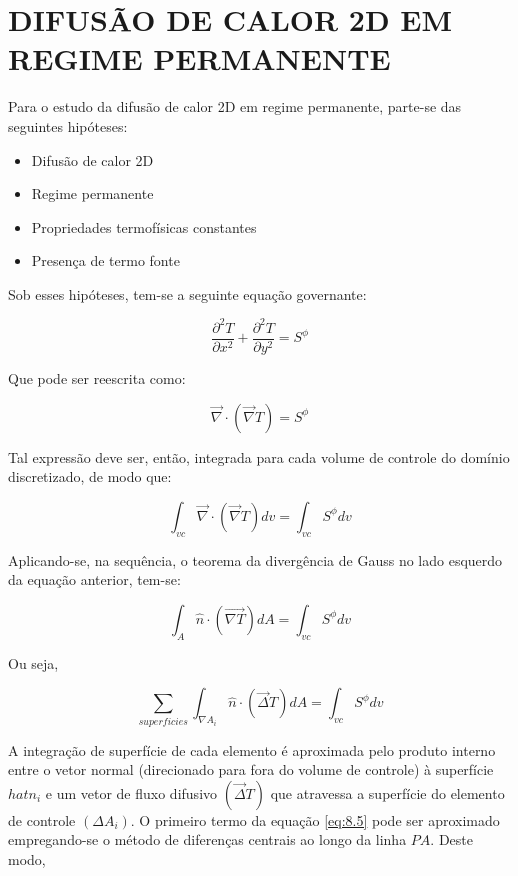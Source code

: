 \chapter[DIFUSÃO DE CALOR 2D EM REGIME PERMANENTE]{DIFUSÃO DE CALOR 2D EM REGIME PERMANENTE}

Para o estudo da difusão de calor 2D em regime permanente, parte-se das seguintes hipóteses:
\begin{itemize}
    \item Difusão de calor 2D
    \item Regime permanente
    \item Propriedades termofísicas constantes
    \item Presença de termo fonte
\end{itemize}

Sob esses hipóteses, tem-se a seguinte equação governante:

\begin{equation}
    \label{eq:8.1}
    \frac{\partial^2 T}{\partial x^2} + \frac{\partial^2 T}{\partial y^2} = S^\phi
\end{equation}

Que pode ser reescrita como:

\begin{equation}
    \label{eq:8.2}
    \vec{\nabla} \cdot (\vec{\nabla} T) = S^\phi
\end{equation}

Tal expressão deve ser, então, integrada para cada volume de controle do domínio discretizado, de modo que:

\begin{equation}
    \label{eq:8.3}
    \int_{vc} \vec{\nabla} \cdot (\vec{\nabla}T) dv = \int_{vc}S^\phi dv
\end{equation}

Aplicando-se, na sequência, o teorema da divergência de Gauss no lado esquerdo da equação anterior, tem-se:

\begin{equation}
    \label{eq:8.4}
    \int_A \hat{n} \cdot (\vec{\nabla T}) dA = \int_{vc} S^\phi dv
\end{equation}

Ou seja,

\begin{equation}
    \label{eq:8.5}
    \sum_{superficies} \int_{\nabla A_i} \hat{n} \cdot (\vec{\Delta}T)dA = \int_{vc} S^\phi dv
\end{equation}

A integração de superfície de cada elemento é aproximada pelo produto interno entre o vetor normal (direcionado para fora do volume de controle) à superfície $
hat{n_i}$ e um vetor de fluxo difusivo $(\vec{\Delta}T)$ que atravessa a superfície do elemento de controle $(\Delta A_i)$. O primeiro termo da equação \ref{eq:8.5} pode ser aproximado empregando-se o método de diferenças centrais ao longo da linha $PA$. Deste modo,

